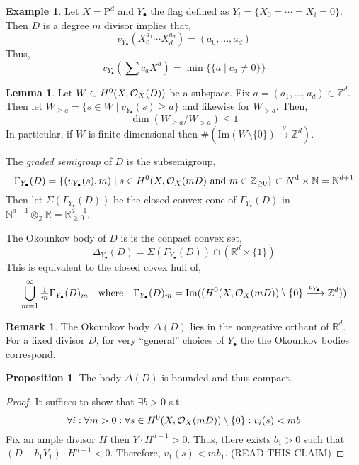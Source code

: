 \documentclass[12pt]{extarticle}
\newcommand{\Z}{\mathbb{Z}}
\newcommand{\R}{\mathbb{R}}
\newcommand{\N}{\mathbb{N}}
\renewcommand{\Im}[1]{\mathrm{Im}(#1)}
\theoremstyle{definition}
\newtheorem{lemma}[theorem]{Lemma}
\newtheorem{proposition}[theorem]{Proposition}
\newtheorem{example}[theorem]{Example}
\newtheorem{remark}{Remark}
\newenvironment{definition}[1][Definition:]{\begin{trivlist}
\item[\hskip \labelsep {\bfseries #1}]}{\end{trivlist}}
\renewcommand{\d}[1]{\mathrm{d} #1}
\begin{document}
\begin{example}
Let $X = \mathrm{P}^d$ and $Y_\bullet$ the flag defined as $Y_i = \{ X_0 = \cdots = X_i = 0 \}$. Then $D$ is a degree $m$ divisor implies that,
\[ v_{Y_\bullet}(X_0^{a_1} \cdots X_d^{a_d}) = (a_0, \dots, a_d) \]
Thus,
\[ v_{Y_\bullet}(\sum c_a X^a) = \min\{ \{ a \mid c_a \neq 0 \} \} \]
\end{example}

\begin{lemma}
Let $W \subset H^0(X, \mathcal{O}_{X}(D))$ be a subspace. Fix $a = (a_1, \dots, a_d) \in \Z^d$. Then let $W_{\ge a} = \{ s \in W \mid v_{Y_\bullet}(s) \ge a \}$ and likewise for $W_{> a}$. Then,
\[ \dim (W_{\ge a} / W_{> a}) \le 1 \]
In particular, if $W$ is finite dimensional then $\# \left( \Im{W \setminus \{ 0 \} } \xrightarrow{\nu} \Z^d \right)$. 
\end{lemma}

\begin{definition}
The \textit{graded semigroup} of $D$ is the subsemigroup,
\[ \Gamma_{Y_\bullet}(D) = \{ (v_{Y_\bullet}(s), m) \mid s \in H^0(X, \struct{X}(mD) \text{ and } m \in \Z_{\ge 0} \} \subset N^\d \times \N = \N^{d + 1} \]
Then let $\Sigma(\Gamma_{Y_\bullet}(D))$ be the closed convex cone of $\Gamma_{Y_\bullet}(D)$ in $\N^{d+1} \otimes_\Z \R = \R_{\ge 0}^{d+1}$.
\end{definition}

\begin{definition}
The Okounkov body of $D$ is is the conpact convex set,
\[ \Delta_{Y_\bullet}(D) = \Sigma(\Gamma_{Y_\bullet}(D)) \cap (\R^d \times \{ 1 \}) \]
This is equivalent to the closed covex hull of,
\[ \bigcup_{m = 1}^\infty \tfrac{1}{m} \Gamma_{Y_\bullet}(D)_m \quad \text{where} \quad \Gamma_{Y_\bullet}(D)_m = \Im{(H^0(X, \struct{X}(mD)) \setminus \{ 0 \} \xrightarrow{v_{Y_\bullet}} \Z^d)} \]
\end{definition}

\begin{remark}
The Okounkov body $\Delta(D)$ lies in the nongeative orthant of $\R^d$. For a fixed divisor $D$, for very ``general'' choices of $Y_\bullet$ the the Okounkov bodies correspond. 
\end{remark}

\begin{proposition}
The body $\Delta(D)$ is bounded and thus compact. 
\end{proposition}

\begin{proof}
It suffices to show that $\exists b > 0$ s.t.
\[ \forall i : \forall m > 0:  \forall s \in H^0(X, \mathcal{O}_{X}(m D)) \setminus \{ 0 \} :  v_i(s) < m b \] 
Fix an ample divisor $H$ then $Y \cdot H^{d - 1} > 0$. Thus, there exists $b_1 > 0$ such that $(D - b_1 Y_1) \cdot H^{d - 1} < 0$. Therefore, $v_1(s) < m b_1$. (READ THIS CLAIM)
\end{proof}
\end{document}
